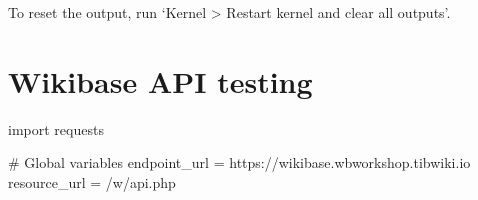\documentclass[
  letterpaper,
  DIV=11,
  numbers=noendperiod]{scrreprt}
\newenvironment{Shaded}{\begin{snugshade}}{\end{snugshade}}
\newcommand{\CommentTok}[1]{\textcolor[rgb]{0.37,0.37,0.37}{#1}}
\newcommand{\ImportTok}[1]{\textcolor[rgb]{0.00,0.46,0.62}{#1}}
\newcommand{\NormalTok}[1]{\textcolor[rgb]{0.00,0.23,0.31}{#1}}
\newcommand{\OperatorTok}[1]{\textcolor[rgb]{0.37,0.37,0.37}{#1}}
\newcommand{\StringTok}[1]{\textcolor[rgb]{0.13,0.47,0.30}{#1}}
\begin{document}
To reset the output, run `Kernel \textgreater{} Restart kernel and clear
all outputs'.

\hypertarget{wikibase-api-testing}{%
\section{Wikibase API testing}\label{wikibase-api-testing}}

\begin{Shaded}
\begin{Highlighting}[]
\ImportTok{import}\NormalTok{ requests}

\CommentTok{\# Global variables}
\NormalTok{endpoint\_url }\OperatorTok{=} \StringTok{\textquotesingle{}https://wikibase.wbworkshop.tibwiki.io\textquotesingle{}}
\NormalTok{resource\_url }\OperatorTok{=} \StringTok{\textquotesingle{}/w/api.php\textquotesingle{}}


\end{Highlighting}
\end{Shaded}
\end{document}
